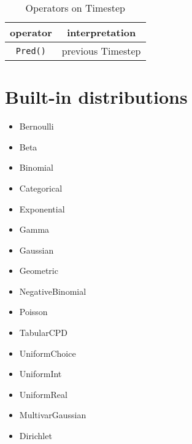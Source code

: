 \documentclass[12pt]{article}
\begin{document}
\begin{table}[h]
\centering
\caption{Operators on Timestep}
\begin{tabular}{ c c }
\toprule 
operator & interpretation \\
\midrule
\verb|Pred()| & previous Timestep\\
\bottomrule
\end{tabular}
\end{table}



\section{Built-in distributions}
\begin{itemize}
\item Bernoulli
\item Beta
\item Binomial
\item Categorical
\item Exponential
\item Gamma
\item Gaussian
\item Geometric
\item NegativeBinomial
\item Poisson
\item TabularCPD
\item UniformChoice
\item UniformInt
\item UniformReal
\item MultivarGaussian
\item Dirichlet
\end{itemize}
\end{document}
